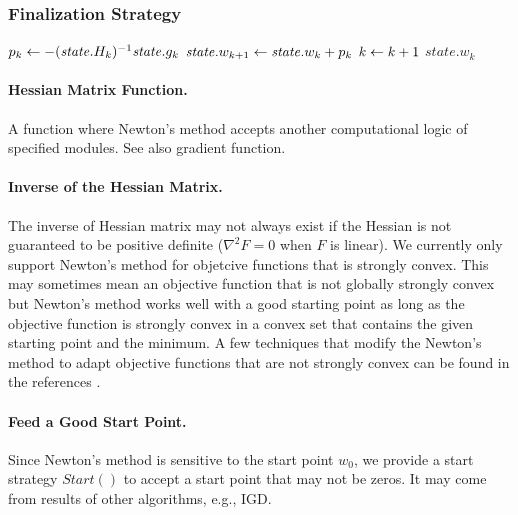 \subsubsection{Finalization Strategy}
\begin{algorithm} \label{alg:finalization-newton}
\begin{algorithmic}[1]
    \State $p_k \leftarrow - (\mathit{state}.H_k)^{-1} \mathit{state}.g_k$
    \State $\mathit{state}.w_{k+1} \leftarrow \mathit{state}.w_k + p_k$
    \State $k \leftarrow k + 1$
    \State \Return $\mathit{state}.w_k$
\end{algorithmic}
\end{algorithm}

\paragraph{Hessian Matrix Function.}
A function where Newton's method accepts another computational logic of specified modules. See also gradient function.

\paragraph{Inverse of the Hessian Matrix.}
The inverse of Hessian matrix may not always exist if the Hessian is not guaranteed to be positive definite ($\nabla^2 F = 0$ when $F$ is linear).
We currently only support Newton's method for objetcive functions that is strongly convex.
This may sometimes mean an objective function that is not globally strongly convex but Newton's method works well with a good starting point as long as the objective function is strongly convex in a convex set that contains the given starting point and the minimum.
A few techniques that modify the Newton's method to adapt objective functions that are not strongly convex can be found in the references \cite{bertsekas1999nonlinear, nocedal2006numerical}.

\paragraph{Feed a Good Start Point.}
Since Newton's method is sensitive to the start point $w_0$, we provide a start strategy $\mathit{Start()}$ to accept a start point that may not be zeros.
It may come from results of other algorithms, e.g., IGD.


